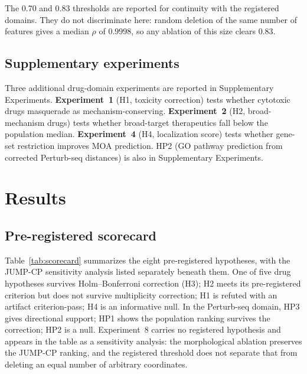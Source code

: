 \documentclass[11pt]{article}
\begin{document}
The 0.70 and 0.83 thresholds are reported for continuity with the registered
domains. They do not discriminate here: random deletion of the same number of
features gives a median $\rho$ of $0.9998$, so any ablation of this size
clears $0.83$.

\subsection{Supplementary experiments}

Three additional drug-domain experiments are reported in Supplementary
Experiments. \textbf{Experiment~1}
(H1, toxicity correction) tests whether cytotoxic drugs masquerade as
mechanism-conserving. \textbf{Experiment~2} (H2, broad-mechanism drugs)
tests whether broad-target therapeutics fall below the population median.
\textbf{Experiment~4} (H4, localization score) tests whether gene-set
restriction improves MOA prediction. HP2 (GO pathway prediction from
corrected Perturb-seq distances) is also in Supplementary Experiments.

\section{Results}

\subsection{Pre-registered scorecard}

Table~\ref{tab:scorecard} summarizes the eight pre-registered hypotheses,
with the JUMP-CP sensitivity analysis listed separately beneath them.
One of five drug hypotheses survives Holm--Bonferroni correction (H3);
H2 meets its pre-registered criterion but does not survive multiplicity
correction; H1 is refuted with an artifact criterion-pass; H4 is an
informative null.
In the Perturb-seq domain, HP3 gives directional support; HP1 shows the population
ranking survives the correction; HP2 is a null. Experiment~8 carries
no registered hypothesis and appears in the table as a sensitivity analysis:
the morphological ablation preserves the JUMP-CP ranking, and the registered
threshold does not separate that from deleting an equal number of arbitrary
coordinates.
\end{document}
